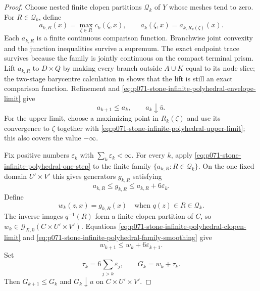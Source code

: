 \begin{proof}
Choose nested finite clopen partitions $\mathscr Q_k$ of $Y$ whose meshes
tend to zero.  For $R\in\mathscr Q_k$, define
\begin{equation}
 a_{k,R}(x)=\max_{\zeta\in R}c_k(\zeta,x),
 \qquad
 a_k(\zeta,x)=a_{k,R_k(\zeta)}(x).
 \label{eq:p071-stone-infinite-polyhedral-clopen-max}
\end{equation}
Each $a_{k,R}$ is a finite continuous comparison function.  Branchwise
joint convexity and the junction inequalities survive a supremum.  The
exact endpoint trace survives because the family is jointly continuous on
the compact terminal prism.  Lift $a_{k,R}$ to $D\times Q$ by making every
branch outside $A\cup K$ equal to its node slice; the two-stage barycentre
calculation in
 shows that the
lift is still an exact comparison function.  Refinement and
\eqref{eq:p071-stone-infinite-polyhedral-envelope-limit} give
\begin{equation}
                              a_{k+1}\leq a_k,
                 \qquad      a_k\downarrow\bar u.
 \label{eq:p071-stone-infinite-polyhedral-clopen-limit}
\end{equation}
For the upper limit, choose a maximizing point in $R_k(\zeta)$ and use its
convergence to $\zeta$ together with
\eqref{eq:p071-stone-infinite-polyhedral-upper-limit}; this also covers
the value $-\infty$.

Fix positive numbers $\varepsilon_k$ with
$\sum_k\varepsilon_k<\infty$.  For every $k$, apply
\eqref{eq:p071-stone-infinite-polyhedral-one-step} to the finite family
$\{a_{k,R}:R\in\mathscr Q_k\}$.  On the one fixed domain
$U'\times V'$ this gives generators $g_{k,R}$ satisfying
\begin{equation}
                   a_{k,R}\leq g_{k,R}
                       \leq a_{k,R}+6\varepsilon_k.
 \label{eq:p071-stone-infinite-polyhedral-family-smoothing}
\end{equation}
Define
\[
 w_k(z,x)=g_{k,R}(x)
 \quad\text{when }q(z)\in R\in\mathscr Q_k.
\]
The inverse images $q^{-1}(R)$ form a finite clopen partition of $C$, so
$w_k\in\mathcal G_{X,0}(C\times U'\times V')$.  Equations
\eqref{eq:p071-stone-infinite-polyhedral-clopen-limit} and
\eqref{eq:p071-stone-infinite-polyhedral-family-smoothing} give
\[
                         w_{k+1}\leq w_k+6\varepsilon_{k+1}.
\]
Set
\[
             \tau_k=6\sum_{j>k}\varepsilon_j,
             \qquad G_k=w_k+\tau_k.
\]
Then $G_{k+1}\leq G_k$ and
$G_k\downarrow u$ on $C\times U'\times V'$.


\end{proof}
